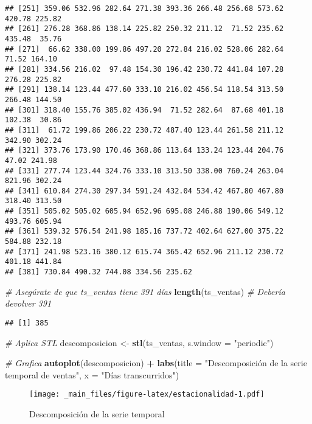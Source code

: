 \documentclass[
]{book}
\newenvironment{Shaded}{\begin{snugshade}}{\end{snugshade}}
\newcommand{\AttributeTok}[1]{\textcolor[rgb]{0.13,0.29,0.53}{#1}}
\newcommand{\CommentTok}[1]{\textcolor[rgb]{0.56,0.35,0.01}{\textit{#1}}}
\newcommand{\FunctionTok}[1]{\textcolor[rgb]{0.13,0.29,0.53}{\textbf{#1}}}
\newcommand{\NormalTok}[1]{#1}
\newcommand{\OtherTok}[1]{\textcolor[rgb]{0.56,0.35,0.01}{#1}}
\newcommand{\SpecialCharTok}[1]{\textcolor[rgb]{0.81,0.36,0.00}{\textbf{#1}}}
\newcommand{\StringTok}[1]{\textcolor[rgb]{0.31,0.60,0.02}{#1}}
\begin{document}
\begin{verbatim}
## [251] 359.06 532.96 282.64 271.38 393.36 266.48 256.68 573.62 420.78 225.82
## [261] 276.28 368.86 138.14 225.82 250.32 211.12  71.52 235.62 435.48  35.76
## [271]  66.62 338.00 199.86 497.20 272.84 216.02 528.06 282.64  71.52 164.10
## [281] 334.56 216.02  97.48 154.30 196.42 230.72 441.84 107.28 276.28 225.82
## [291] 138.14 123.44 477.60 333.10 216.02 456.54 118.54 313.50 266.48 144.50
## [301] 318.40 155.76 385.02 436.94  71.52 282.64  87.68 401.18 102.38  30.86
## [311]  61.72 199.86 206.22 230.72 487.40 123.44 261.58 211.12 342.90 302.24
## [321] 373.76 173.90 170.46 368.86 113.64 133.24 123.44 204.76  47.02 241.98
## [331] 277.74 123.44 324.76 333.10 313.50 338.00 760.24 263.04 821.96 302.24
## [341] 610.84 274.30 297.34 591.24 432.04 534.42 467.80 467.80 318.40 313.50
## [351] 505.02 505.02 605.94 652.96 695.08 246.88 190.06 549.12 493.76 605.94
## [361] 539.32 576.54 241.98 185.16 737.72 402.64 627.00 375.22 584.88 232.18
## [371] 241.98 523.16 380.12 615.74 365.42 652.96 211.12 230.72 401.18 441.84
## [381] 730.84 490.32 744.08 334.56 235.62
\end{verbatim}

\begin{Shaded}
\begin{Highlighting}[]
\CommentTok{\# Asegúrate de que ts\_ventas tiene 391 días}
\FunctionTok{length}\NormalTok{(ts\_ventas)  }\CommentTok{\# Debería devolver 391}
\end{Highlighting}
\end{Shaded}

\begin{verbatim}
## [1] 385
\end{verbatim}

\begin{Shaded}
\begin{Highlighting}[]
\CommentTok{\# Aplica STL}
\NormalTok{descomposicion }\OtherTok{\textless{}{-}} \FunctionTok{stl}\NormalTok{(ts\_ventas, }\AttributeTok{s.window =} \StringTok{"periodic"}\NormalTok{)}

\CommentTok{\# Grafica}
\FunctionTok{autoplot}\NormalTok{(descomposicion) }\SpecialCharTok{+}
  \FunctionTok{labs}\NormalTok{(}\AttributeTok{title =} \StringTok{"Descomposición de la serie temporal de ventas"}\NormalTok{,}
       \AttributeTok{x =} \StringTok{"Días transcurridos"}\NormalTok{)}
\end{Highlighting}
\end{Shaded}

\begin{figure}
\centering
\texttt{[image: \_main\_files/figure-latex/estacionalidad-1.pdf]}
\caption{\label{fig:estacionalidad}Descomposición de la serie temporal}
\end{figure}
\end{document}

